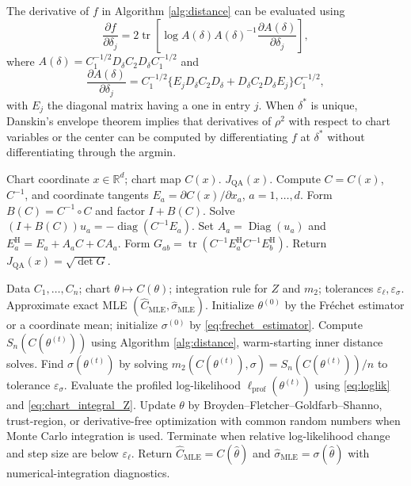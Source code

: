 \documentclass[
  12pt]{article}
\newcommand{\diag}{\operatorname{diag}}
\newcommand{\Diag}{\operatorname{Diag}}
\newcommand{\tr}{\operatorname{tr}}
\newcommand{\R}{\mathbb R}
\newcommand{\QA}{\mathrm{QA}}
\newcommand{\Had}{\circ}
\begin{document}
The derivative of $f$ in Algorithm \ref{alg:distance} can be evaluated using
\[
\frac{\partial f}{\partial\delta_j}=2\tr\left[\log A(\delta)A(\delta)^{-1}\frac{\partial A(\delta)}{\partial\delta_j}\right],
\]
where $A(\delta)=C_1^{-1/2}D_{\delta}C_2D_{\delta}C_1^{-1/2}$ and
\[
\frac{\partial A(\delta)}{\partial\delta_j}=C_1^{-1/2}\{E_jD_{\delta}C_2D_{\delta}+D_{\delta}C_2D_{\delta}E_j\}C_1^{-1/2},
\]
with $E_j$ the diagonal matrix having a one in entry $j$. When $\delta^*$ is unique, Danskin's envelope theorem implies that derivatives of $\rho^2$ with respect to chart variables or the center can be computed by differentiating $f$ at $\delta^*$ without differentiating through the argmin.

\begin{algorithm}[H]
\caption{Quotient-affine volume density in a chart}
\label{alg:volume_density}
\begin{algorithmic}[1]
\Require Chart coordinate $x\in\R^d$; chart map $C(x)$.
\Ensure $J_{\QA}(x)$.
\State Compute $C=C(x)$, $C^{-1}$, and coordinate tangents $E_a=\partial C(x)/\partial x_a$, $a=1,\ldots,d$.
\State Form $B(C)=C^{-1}\Had C$ and factor $I+B(C)$.
    \State Solve $(I+B(C))u_a=-\diag(C^{-1}E_a)$.
    \State Set $A_a=\Diag(u_a)$ and $E_a^{\mathrm H}=E_a+A_aC+CA_a$.
\EndFor
\State Form $G_{ab}=\tr(C^{-1}E_a^{\mathrm H}C^{-1}E_b^{\mathrm H})$.
\State Return $J_{\QA}(x)=\sqrt{\det G}$.
\end{algorithmic}
\end{algorithm}



\begin{algorithm}[H]
\caption{Exact MLE by profiled likelihood}
\label{alg:exact_mle}
\begin{algorithmic}[1]
\Require Data $C_1,\ldots,C_n$; chart $\theta\mapsto C(\theta)$; integration rule for $Z$ and $m_2$; tolerances $\varepsilon_{\ell},\varepsilon_{\sigma}$.
\Ensure Approximate exact MLE $(\widehat C_{\mathrm{MLE}},\widehat\sigma_{\mathrm{MLE}})$.
\State Initialize $\theta^{(0)}$ by the Fr\'echet estimator or a coordinate mean; initialize $\sigma^{(0)}$ by \eqref{eq:frechet_estimator}.
    \State Compute $S_n(C(\theta^{(t)}))$ using Algorithm \ref{alg:distance}, warm-starting inner distance solves.
    \State Find $\sigma(\theta^{(t)})$ by solving $m_2(C(\theta^{(t)}),\sigma)=S_n(C(\theta^{(t)}))/n$ to tolerance $\varepsilon_{\sigma}$.
    \State Evaluate the profiled log-likelihood $\ell_{\mathrm{prof}}(\theta^{(t)})$ using \eqref{eq:loglik} and \eqref{eq:chart_integral_Z}.
    \State Update $\theta$ by Broyden--Fletcher--Goldfarb--Shanno, trust-region, or derivative-free optimization with common random numbers when Monte Carlo integration is used.
    \State Terminate when relative log-likelihood change and step size are below $\varepsilon_{\ell}$.
\EndFor
\State Return $\widehat C_{\mathrm{MLE}}=C(\widehat\theta)$ and $\widehat\sigma_{\mathrm{MLE}}=\sigma(\widehat\theta)$ with numerical-integration diagnostics.
\end{algorithmic}
\end{algorithm}
\end{document}
